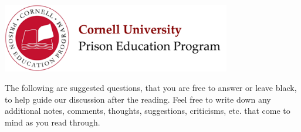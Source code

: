 \documentclass[12pt]{article}
\begin{document}
\begin{center}
\includegraphics[width=10cm]{../images/logo.png}
\end{center}

\begin{center}
\end{center}

The following are suggested questions, that you are free to answer or leave black, to help guide our discussion after the reading. Feel free to write down any additional notes, comments, thoughts, suggestions, criticisms, etc. that come to mind as you read through.
\end{document}
